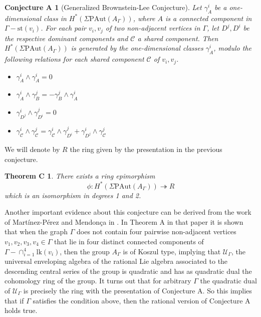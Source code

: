 \documentclass[a4paper]{amsart}
\newcommand{\G}{\Gamma}
\newcommand{\C}{\mathcal{C}}
\newcommand{\PAut}{\Sigma\mathrm{PAut}}
\newcommand{\lk}{\mathrm{lk}}
\newcommand{\st}{\mathrm{st}}
\newtheorem*{teoC}{Theorem C}
\newtheorem*{conjA}{Conjecture A}
\theoremstyle{definition}
\theoremstyle{remark}
\begin{document}
\begin{conjA}[Generalized Brownstein-Lee Conjecture]\label{ConjA}
Let $\gamma_A^i$ be a one-dimensional class in
$H^*(\PAut(A_\G))$, where $A$ is a connected component in $\G-\st(v_i)$. For each pair $v_i,v_j$ of two non-adjacent vertices in $\G$, let $D^j, D^i$ be the respective dominant components and $\mathcal{C}$ a shared component. Then $H^*(\PAut(A_\G))$ is generated by the one-dimensional classes $\gamma_A^i$, modulo the following relations for each shared component $\C$ of $v_i,v_j$.
\begin{itemize}
        \item[(1)] $\gamma_A^i\wedge\gamma_A^i=0$
        \item[(2)] $\gamma_A^i\wedge\gamma_B^j=-\gamma_B^j\wedge\gamma_A^i$
        \item[(3)] $\gamma_{D^j}^i\wedge \gamma_{D^i}^j=0$ 
        \item[(4)] $\gamma_{\mathcal{C}}^i\wedge \gamma_{\mathcal{C}}^j=\gamma_{\mathcal{C}}^i\wedge \gamma_{D^i}^j+ \gamma_{D^j}^i\wedge\gamma_{\mathcal{C}}^j$ 
    \end{itemize}
\end{conjA}

We will denote by $R$ the ring given by the presentation in the previous  conjecture.

\begin{teoC}
     There exists a ring epimorphism
    $$
    \phi:H^*(\PAut(A_\G)) \twoheadrightarrow R
    $$
which is an isomorphism in degrees 1 and 2.
    
    \label{teo:H2_1}
\end{teoC}

Another important evidence about this conjecture can be derived from the work of Martínez-Pérez and Mendonça in \cite{MarMen}. 
In Theorem A in that paper it is shown that when the graph $\G$ does not contain four pairwise non-adjacent vertices $v_1,v_2,v_3,v_4\in\G$ that lie in four distinct connected components of $\G-\cap_{i=1}^4\lk(v_i)$, then the group $A_\Gamma$ is of Koszul type, implying that $\mathcal{U}_\G$, the universal enveloping algebra of the rational Lie algebra associated to the descending central series of the group is quadratic and has as quadratic dual the cohomology ring of the group. It turns out \cite{MarMen} that for arbitrary $\Gamma$ the quadratic dual of $\mathcal{U}_\G$ is precisely the ring with the presentation of Conjecture A. So this implies that if $\Gamma$ satisfies the condition above, then the rational version of Conjecture A holds true.
\end{document}
